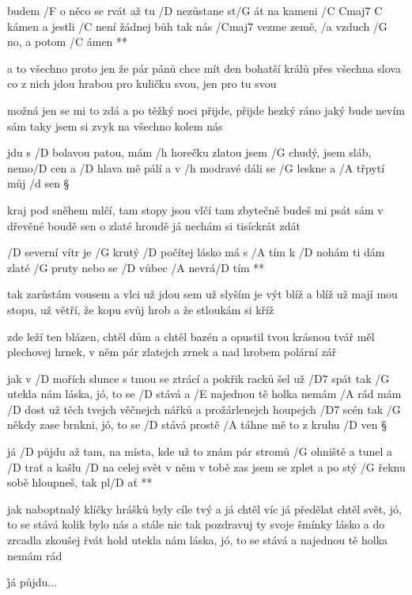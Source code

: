 \R budem /F o něco se rvát
   až tu /D nezůstane st/G át na kameni /{C Cmaj7 C} kámen
   a jestli /C není žádnej bůh
   tak nás /Cmaj7 vezme země, /a vzduch /G no, a potom /C ámen **

a to všechno proto jen
že pár pánů chce mít den bohatší králů
přes všechna slova co z nich jdou
hrabou pro kuličku svou, jen pro tu svou \s

možná jen se mi to zdá
a po těžký noci přijde, přijde hezký ráno
jaký bude nevím sám
taky jsem si zvyk na všechno kolem nás




jdu s /D bolavou patou, mám /h horečku zlatou
jsem /G chudý, jsem sláb, nemo/D cen
a /D hlava mě pálí a v /h modravé dáli
se /G leskne a /A třpytí můj /d sen \S

kraj pod sněhem mlčí, tam stopy jsou vlčí
tam zbytečně budeš mi psát
sám v dřevěné boudě sen o zlaté hroudě
já nechám si tisíckrát zdát \s

\R /D severní vítr je /G krutý
   /D počítej lásko má s /A tím
   k /D nohám ti dám zlaté /G pruty
   nebo se /D vůbec /A nevrá/D tím **

tak zarůstám vousem a vlci už jdou sem
už slyším je výt blíž a blíž
už mají mou stopu, už větří, že kopu
svůj hrob a že stloukám si kříž \s

zde leží ten blázen, chtěl dům a chtěl bazén
a opustil tvou krásnou tvář
měl plechovej hrnek, v něm pár zlatejch zrnek
a nad hrobem polární zář




jak v /D mořích slunce s tmou se ztrácí
a pokřik racků šel už /D7 spát
tak /G utekla nám láska, jó, to se /D stává
a /E najednou tě holka nemám /A rád
mám /D dost už těch tvejch věčnejch nářků
a prožárlenejch houpejch /D7 scén
tak /G někdy zase brnkni, jó, to se /D stává
prostě /A táhne mě to z kruhu /D ven \S

\R já /D půjdu až tam, na místa, kde už to znám
   pár stromů /G ohniště a tunel a /D trať
   a kašlu /D na celej svět v něm v tobě zas jsem se zplet
   a po stý /G řeknu sobě hloupneš, tak pl/D ať **

jak naboptnalý klíčky hrášků
byly cíle tvý a já chtěl víc
já předělat chtěl svět, jó, to se stává
kolik bylo nás a stále nic
tak pozdravuj ty svoje šmínky lásko
a do zrcadla zkoušej řvát
hold utekla nám láska, jó, to se stává
a najednou tě holka nemám rád \s

\r já půjdu...



